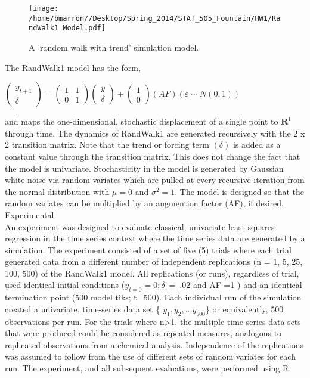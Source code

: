 \documentclass[a4paper,11pt]{article}
\begin{document}
\begin{figure}
\caption{A 'random walk with trend' simulation model.}
    \texttt{[image: /home/bmarron//Desktop/Spring\_2014/STAT\_505\_Fountain/HW1/RandWalk1\_Model.pdf]}
\end{figure}

The RandWalk1 model has the form,
\begin{center}

$ \left( \begin{array}{c}
y_{t+1} \\
\delta 
\end{array} \right) = \left( \begin{array}{cc}
1 & 1\\
0 & 1
\end{array} \right) \left( \begin{array}{c}
y \\
\delta 
\end{array} \right) + \left( \begin{array}{c}
1 \\
0
\end{array} \right) (AF)(\varepsilon \sim N(0, 1)) $

\end{center}
and maps the one-dimensional, stochastic displacement of a single point to $\textbf{R}^{1}$ through time. The dynamics of RandWalk1 are generated recursively with the 2 x 2 transition matrix. Note that the trend or forcing term $ (\delta )$ is added as a constant value through the transition matrix.  This does not change the fact that the model is univariate. Stochasticity in the model is generated by Gaussian white noise via random variates which are pulled at every recursive iteration from the normal distribution with $ \mu =0 $ and $ \sigma ^{2}=1 $. The model is designed so that the random variates can be multiplied by an augmention factor (AF), if desired.\\

\underline{Experimental}\\

An experiment was designed to evaluate classical, univariate least squares regression in the time series context where the time series data are generated by a simulation.  The experiment consisted of a set of five (5) trials where each trial generated data from a different number of independent replications (n = 1, 5, 25, 100, 500) of the RandWalk1 model. All replications (or runs), regardless of trial, used identical initial conditions ($ y_{t=0} = 0; \delta \ = \ .02$ and AF =1 ) and an identical termination point (500 model tiks; t=500).  Each individual run of the simulation created a univariate, time-series data set \{ $ y_{1}, y_{2}, ... y_{500}$\} or equivalently, 500 observations per run.  For the trials where n>1, the multiple time-series data sets that were produced could be considered as repeated measures, analogous to replicated observations from a chemical analysis.  Independence of the replications was assumed to follow from the use of different sets of random variates for each run. The experiment, and all subsequent evaluations, were performed using R. \\
\end{document}
